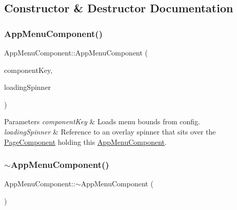 \subsection{Constructor \& Destructor Documentation}
\mbox{\label{classAppMenuComponent_a8f45bc3e1129b74539842cc80347deee}} 
\subsubsection{\texorpdfstring{App\+Menu\+Component()}{AppMenuComponent()}}
{\footnotesize\ttfamily App\+Menu\+Component\+::\+App\+Menu\+Component (\begin{DoxyParamCaption}\item[{String}]{component\+Key,  }\item[{\mbox{\hyperlink{classOverlaySpinner}{Overlay\+Spinner}} \&}]{loading\+Spinner }\end{DoxyParamCaption})}


\begin{DoxyParams}{Parameters}
{\em component\+Key} & Loads menu bounds from config.\\
\hline
{\em loading\+Spinner} & Reference to an overlay spinner that sits over the \mbox{\hyperlink{classPageComponent}{Page\+Component}} holding this \mbox{\hyperlink{classAppMenuComponent}{App\+Menu\+Component}}. \\
\hline
\end{DoxyParams}
\mbox{\label{classAppMenuComponent_a60eac163da7fb829ff5fe09f23df295f}} 
\subsubsection{\texorpdfstring{$\sim$\+App\+Menu\+Component()}{~AppMenuComponent()}}
{\footnotesize\ttfamily App\+Menu\+Component\+::$\sim$\+App\+Menu\+Component (\begin{DoxyParamCaption}{ }\end{DoxyParamCaption})\hspace{0.3cm}{\ttfamily [virtual]}}



